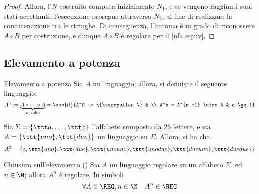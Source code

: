\documentclass[a4paper, 12pt]{report}
\begin{document}
\begin{proof}

        Allora, l'\NFA $N$ costruito computa inizialmente $N_1$, e se vengono raggiunti suoi stati accettanti, l'esecuzione prosegue attraverso $N_2$, al fine di realizzare la concatenazione tra le stringhe. Di conseguenza, l'automa è in grado di riconoscere $A \circ B$ per costruzione, e dunque $A \circ B$ è regolare per il \cref{nfa equiv}.
    \end{proof}

    \subsection{Elevamento a potenza}

    \begin{frameddefn}{Elevamento a potenza}
        Sia $A$ un linguaggio; allora, si definisce  il seguente linguaggio: $$A^n := \underbrace{A \circ \cdots \circ A}_{n \ \textrm{volte}} = \soe{ll}{A^0 := \{\varepsilon \} & \\ A^n = A^{n -1} \circ A & n \ge 1}$$
    \end{frameddefn}

    \begin{example}
        Sia $\Sigma = \{\ttt a , \ldots, \ttt z\}$ l'alfabeto composto da 26 lettere, e sia $A = \{\ttt{uno}, \ttt{due}\}$ un linguaggio su $\Sigma$. Allora, si ha che $$A^2 = \{\varepsilon, \ttt{uno}, \ttt{due}, \ttt{unouno}, \ttt{unodue}, \ttt{dueuno}, \ttt{duedue}\}$$
    \end{example}

    \begin{framedprop}{Chiusura sull'elevamento (\REG)}
        Sia $A$ un linguaggio regolare su un alfabeto $\Sigma$, ed $n \in \N$; allora $A^n$ è regolare. In simboli $$\forall A \in \REG, n \in \N \quad A^n \in \REG$$
    \end{framedprop}

\end{document}

